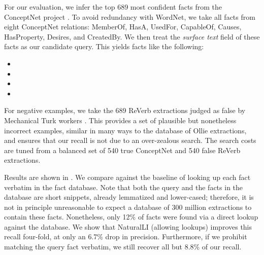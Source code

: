 For our evaluation, we infer the top 689 most confident facts from
  the ConceptNet project \cite{key:2011tandon-conceptnet}.
To avoid redundancy with WordNet, we take all facts from eight
  ConceptNet relations: 
    MemberOf,
    HasA,
    UsedFor,
    CapableOf,
    Causes,
    HasProperty,
    Desires, and 
    CreatedBy.
We then treat the \textit{surface text} field of these facts as our
  candidate query.
This yields facts like the following:

\vspace{-0.25em}
\begin{itemize}
\setlength{\itemsep}{-4pt}
\item[] 
\item[] 
\item[] 
\item[] 
\end{itemize}
\vspace{-0.25em}

For negative examples, we take the 689 ReVerb extractions
  \cite{key:2011fader-reverb}
  judged as false by Mechanical Turk workers \cite{key:2013angeli-truth}.
This provides a set of plausible but nonetheless incorrect examples,
  similar in many ways to the database of Ollie extractions, 
  and ensures that our recall is not due to an over-zealous search.
The search costs are tuned from a balanced set of 540 true ConceptNet and
  540 false ReVerb extractions.

Results are shown in .
We compare against the baseline of looking up each fact verbatim in the
  fact database.
Note that both the query and the facts in the database are 
  short snippets, already lemmatized and lower-cased;
  therefore, it is not in principle unreasonable to
  expect a database of 300 million extractions to contain these facts.
Nonetheless, only 12\% of facts were found via a direct lookup against
  the database.
We show that NaturalLI (allowing lookups) improves this recall
  four-fold, at only an 6.7\% drop in precision.
Furthermore, if we prohibit matching the query fact verbatim,
  we still recover all but 8.8\% of our recall.



%
%
